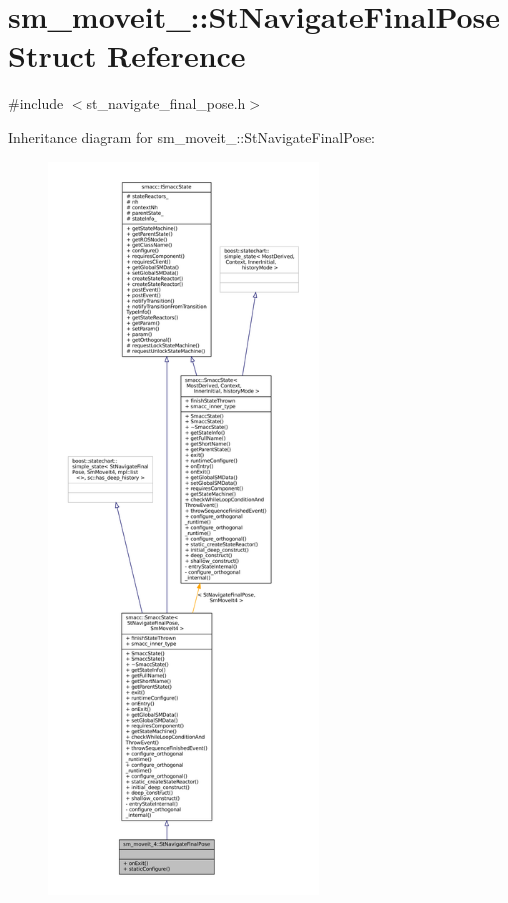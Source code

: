 \hypertarget{structsm__moveit__4_1_1StNavigateFinalPose}{}\section{sm\+\_\+moveit\+\_\+:\+:St\+Navigate\+Final\+Pose Struct Reference}
\label{structsm__moveit__4_1_1StNavigateFinalPose}


{\ttfamily \#include $<$st\+\_\+navigate\+\_\+final\+\_\+pose.\+h$>$}



Inheritance diagram for sm\+\_\+moveit\+\_\+:\+:St\+Navigate\+Final\+Pose\+:
\nopagebreak
\begin{figure}[H]
\begin{center}
\leavevmode
\includegraphics[height=550pt]{structsm__moveit__4_1_1StNavigateFinalPose__inherit__graph}
\end{center}
\end{figure}


